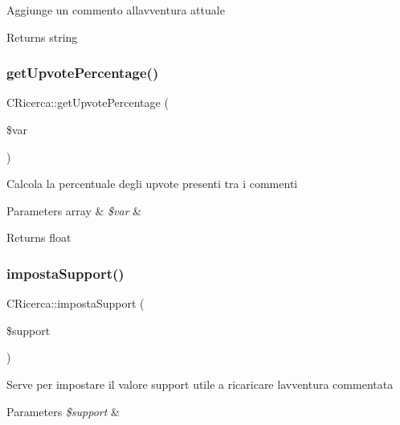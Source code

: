 Aggiunge un commento all\textquotesingle{}avventura attuale

\begin{DoxyReturn}{Returns}
string 
\end{DoxyReturn}
\mbox{\label{class_c_ricerca_a1792ba41fe84b680ca7cee896402a83a}} 
\subsubsection{\texorpdfstring{get\+Upvote\+Percentage()}{getUpvotePercentage()}}
{\footnotesize\ttfamily C\+Ricerca\+::get\+Upvote\+Percentage (\begin{DoxyParamCaption}\item[{}]{\$var }\end{DoxyParamCaption})}

Calcola la percentuale degli upvote presenti tra i commenti


\begin{DoxyParams}[1]{Parameters}
array & {\em \$var} & \\
\hline
\end{DoxyParams}
\begin{DoxyReturn}{Returns}
float 
\end{DoxyReturn}
\mbox{\label{class_c_ricerca_a08fab74f09629da7944d8fb462db99f2}} 
\subsubsection{\texorpdfstring{imposta\+Support()}{impostaSupport()}}
{\footnotesize\ttfamily C\+Ricerca\+::imposta\+Support (\begin{DoxyParamCaption}\item[{}]{\$support }\end{DoxyParamCaption})}

Serve per impostare il valore support utile a ricaricare l\textquotesingle{}avventura commentata


\begin{DoxyParams}{Parameters}
{\em \$support} & \\
\hline
\end{DoxyParams}
\mbox{\label{class_c_ricerca_a149757b6826a18b0b3da3045cbeadd4c}} 
